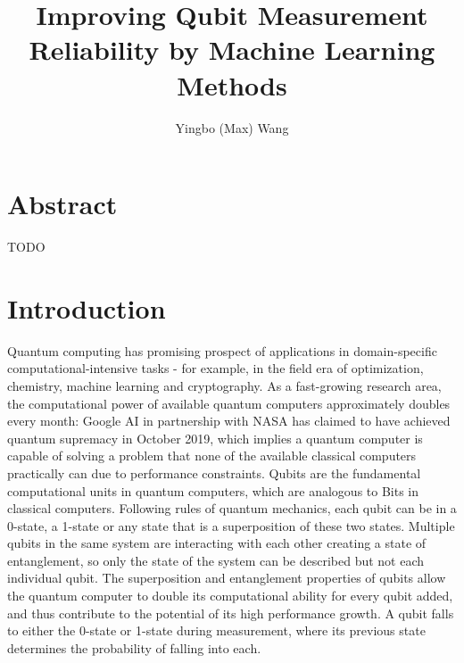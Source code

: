 \documentclass[letterpaper,twocolumn,10pt]{article}
\begin{document}
\title{Improving Qubit Measurement Reliability by Machine Learning Methods}

\author{Yingbo (Max) Wang}

\maketitle

\section{Abstract}

TODO

\section{Introduction}

Quantum computing has promising prospect of applications in domain-specific computational-intensive tasks - for example, in the field era of optimization, chemistry, machine learning and cryptography. As a fast-growing research area, the computational power of available quantum computers approximately doubles every month: Google AI in partnership with NASA has claimed to have achieved quantum supremacy in October 2019, which implies a quantum computer is capable of solving a problem that none of the available classical computers practically can due to performance constraints. Qubits are the fundamental computational units in quantum computers, which are analogous to Bits in classical computers. Following rules of quantum mechanics, each qubit can be in a 0-state, a 1-state or any state that is a superposition of these two states. Multiple qubits in the same system are interacting with each other creating a state of entanglement, so only the state of the system can be described but not each individual qubit. The superposition and entanglement properties of qubits allow the quantum computer to double its computational ability for every qubit added, and thus contribute to the potential of its high performance growth. A qubit falls to either the 0-state or 1-state during measurement, where its previous state determines the probability of falling into each. 
\end{document}
